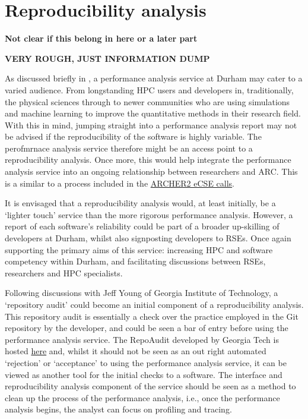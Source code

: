 \chapter{Reproducibility analysis}
\label{chapter:reproducibility-analysis}

\textbf{Not clear if this belong in here or a later part}

\textbf{VERY ROUGH, JUST INFORMATION DUMP}

As discussed briefly in , a performance analysis service at Durham may cater to a varied audience. From longstanding HPC users and developers in, traditionally, the physical sciences through to newer communities who are using simulations and machine learning to improve the quantitative methods in their research field. With this in mind, jumping straight into a performance analysis report may not be advised if the reproducibility of the software is highly variable. The perofmrnace analysis service therefore might be an access point to a reproducibility analysis. Once more, this would help integrate the performance analysis service into an ongoing relationship between researchers and ARC. This is a similar to a process included in the \href{https://www.archer2.ac.uk/ecse/calls/}{ARCHER2 eCSE calls}.

It is envisaged that a reproducibility analysis would, at least initially, be a `lighter touch' service than the more rigorous performance analysis. However, a report of each software's reliability could be part of a broader up-skilling of developers at Durham, whilst also signposting developers to RSEs. Once again supporting the primary aims of this service: increasing HPC and software competency within Durham, and facilitating discussions between RSEs, researchers and HPC specialists.

Following discussions with Jeff Young of Georgia Institute of Technology, a `repository audit' could become an initial component of a reproducibility analysis. This repository audit is essentially a check over the practice employed in the Git repository by the developer, and could be seen a bar of entry before using the performance analysis service. The RepoAudit developed by Georgia Tech is hosted \href{https://github.com/orgs/gt-sse-center/repositories}{here} and, whilst it should not be seen as an out right automated `rejection' or `acceptance' to using the performance analysis service, it can be viewed as another tool for the initial checks to a software. The interface and reproducibility analysis component of the service should be seen as a method to clean up the process of the performance analysis, i.e., once the performance analysis begins, the analyst can focus on profiling and tracing.

